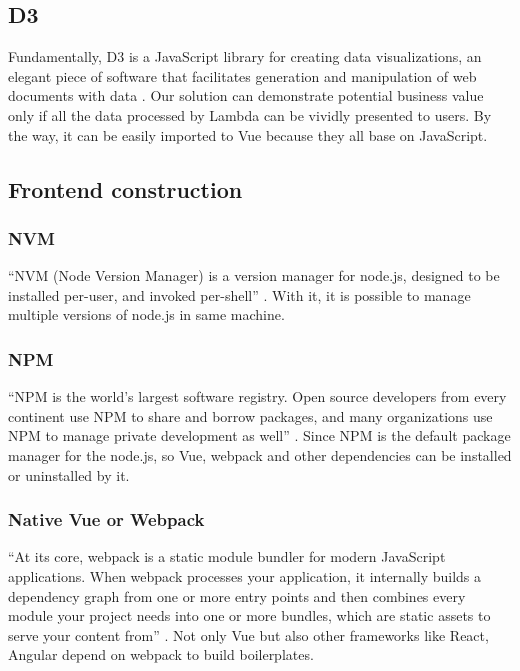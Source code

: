 \documentclass[conference]{IEEEtran}
\begin{document}
\subsection{D3}

Fundamentally, D3 is a JavaScript library for creating data visualizations, an elegant piece of software that facilitates 
generation and manipulation of web documents with data \cite{2013Interactive}. Our solution can demonstrate potential business 
value only if all the data processed by Lambda can be vividly presented to users. By the way, it can be easily imported to 
Vue because they all base on JavaScript.
 
\subsection{Frontend construction}

\subsubsection{NVM}
	
“NVM (Node Version Manager) is a version manager for node.js, designed to be installed per-user, and invoked per-shell” 
\cite{nvmshnvm87:online}. With it, it is possible to manage multiple versions of node.js in same machine.

\subsubsection{NPM}

“NPM is the world's largest software registry. Open source developers from every continent use NPM to share and borrow packages, 
and many organizations use NPM to manage private development as well” \cite{Aboutnpm31:online}. Since NPM is the default package manager for the 
node.js, so Vue, webpack and other dependencies can be installed or uninstalled by it.

\subsubsection{Native Vue or Webpack}

“At its core, webpack is a static module bundler for modern JavaScript applications. When webpack processes your application, it 
internally builds a dependency graph from one or more entry points and then combines every module your project needs into one or 
more bundles, which are static assets to serve your content from” \cite{Concepts28:online}. Not only Vue but also other frameworks like React, 
Angular depend on webpack to build boilerplates.
\end{document}
